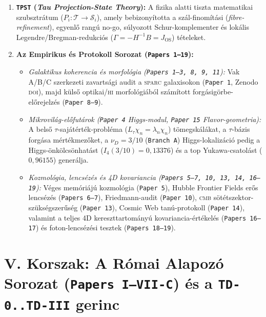 \documentclass[11pt,a4paper]{article}
\begin{document}
\begin{enumerate}[leftmargin=1.5em]
\item \textbf{\texttt{TPST} (\emph{Tau Projection-State Theory}):}
A fizika alatti tiszta matematikai szubsztrátum ($P_i : \mathcal{T} \to \mathcal{S}_i$), amely bebizonyította a szál-finomítási (\emph{fibre-refinement}), egyenl\H{o} rangú no-go, súlyozott Schur-komplementer és lokális Legendre/Bregman-redukciós ($\Gamma = -H^{-1}B = J_{\mathrm{OS}}$) tételeket.
\item \textbf{Az Empirikus és Protokoll Sorozat (\texttt{Papers 1--19}):}
\begin{itemize}
\item \emph{Galaktikus koherencia és morfológia (\texttt{Papers 1--3, 8, 9, 11}):} Vak A/B/C szerkezeti zavartsági audit a \textsc{sparc} galaxisokon (\texttt{Paper 1}, Zenodo \textsc{doi}), majd küls\H{o} optikai/\textsc{hi} morfológiából számított forgásigörbe-el\H{o}rejelzés (\texttt{Paper 8--9}).
\item \emph{Mikrovilág-el\H{o}futárok (\texttt{Paper 4} Higgs-modul, \texttt{Paper 15} Flavor-geometria):} A bels\H{o} $\tau$-sajátérték-probléma ($L_\tau\chi_n = \lambda_n\chi_n$) tömegskálákat, a $\tau$-bázis forgása mértékmez\H{o}ket, a $\nu_D = 3/10$ (\texttt{Branch A}) Higgs-lokalizáció pedig a Higgs-önkölcsönhatást ($I_4(3/10)=0{,}13376$) és a top Yukawa-csatolást ($0{,}96155$) generálja.
\item \emph{Kozmológia, lencsézés és 4D kovariancia (\texttt{Papers 5--7, 10, 13, 14, 16--19}):} Véges memóriájú kozmológia (\texttt{Paper 5}), Hubble Frontier Fields er\H{o}s lencsézés (\texttt{Papers 6--7}), Friedmann-audit (\texttt{Paper 10}), \textsc{cmb} sötétszektor-szükségszer\H{u}ség (\texttt{Paper 13}), Cosmic Web tanú-protokoll (\texttt{Paper 14}), valamint a teljes 4D kereszttartományú kovariancia-értékelés (\texttt{Papers 16--17}) és foton-lencsézési tesztek (\texttt{Papers 18--19}).
\end{itemize}
\end{enumerate}

\section{V. Korszak: A Római Alapozó Sorozat (\texttt{Papers I--VII-C}) és a \texttt{TD-0..TD-III} gerinc}
\end{document}
